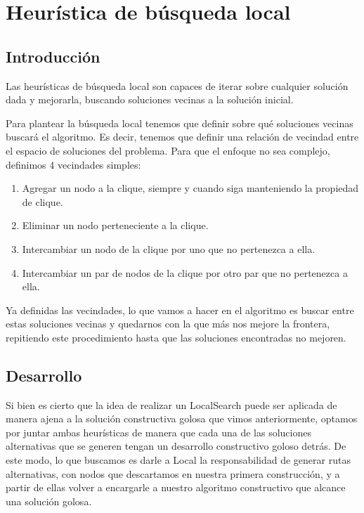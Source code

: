 \section{Heurística de búsqueda local}
\subsection{Introducción}
Las heurísticas de búsqueda local son capaces de iterar sobre cualquier solución dada y
mejorarla, buscando soluciones vecinas a la solución inicial.

Para plantear la búsqueda local tenemos que definir sobre qué soluciones vecinas buscará el algoritmo. Es decir, tenemos que definir una relación de vecindad entre el espacio de soluciones del problema. Para que el enfoque no sea complejo, definimos 4 vecindades simples:

\begin{enumerate}
	\item Agregar un nodo a la clique, siempre y cuando siga manteniendo la propiedad de clique.

	\item Eliminar un nodo perteneciente a la clique.

	\item Intercambiar un nodo de la clique por uno que no pertenezca a ella.

	\item Intercambiar un par de nodos de la clique por otro par que no pertenezca a ella.

\end{enumerate}

Ya definidas las vecindades, lo que vamos a hacer en el algoritmo es buscar entre estas soluciones vecinas y quedarnos con la que más nos mejore la frontera, repitiendo este procedimiento hasta que las soluciones encontradas no mejoren.


\subsection{Desarrollo}
Si bien es cierto que la idea de realizar un LocalSearch puede ser aplicada de manera ajena a la solución constructiva golosa que vimos anteriormente, optamos por juntar ambas heurísticas de manera que cada una de las soluciones alternativas que se generen tengan un desarrollo constructivo goloso detrás. De este modo, lo que buscamos es darle a Local la responsabilidad de generar rutas alternativas, con nodos que descartamos en nuestra primera construcción, y a partir de ellas volver a encargarle a nuestro algoritmo constructivo que alcance una solución golosa.

